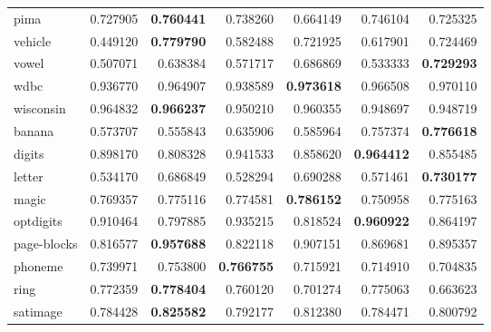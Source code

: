 \begin{tabular}{lrrrrrr}
pima            &         0.727905 &  \textbf{0.760441} &                  0.738260 &       0.664149 &                  0.746104 &       0.725325 \\
vehicle         &         0.449120 &  \textbf{0.779790} &                  0.582488 &       0.721925 &                  0.617901 &       0.724469 \\
vowel           &         0.507071 &  0.638384 &                  0.571717 &       0.686869 &                  0.533333 &       \textbf{0.729293} \\
wdbc            &         0.936770 &  0.964907 &                  0.938589 &       \textbf{0.973618} &                  0.966508 &       0.970110 \\
wisconsin       &         0.964832 &  \textbf{0.966237} &                  0.950210 &       0.960355 &                  0.948697 &       0.948719 \\
banana          &         0.573707 &  0.555843 &                  0.635906 &       0.585964 &                  0.757374 &       \textbf{0.776618} \\
digits          &         0.898170 &  0.808328 &                  0.941533 &       0.858620 &                  \textbf{0.964412} &       0.855485 \\
letter          &         0.534170 &  0.686849 &                  0.528294 &       0.690288 &                  0.571461 &       \textbf{0.730177} \\
magic           &         0.769357 &  0.775116 &                  0.774581 &       \textbf{0.786152} &                  0.750958 &       0.775163 \\
optdigits       &         0.910464 &  0.797885 &                  0.935215 &       0.818524 &                  \textbf{0.960922} &       0.864197 \\
page-blocks     &         0.816577 &  \textbf{0.957688} &                  0.822118 &       0.907151 &                  0.869681 &       0.895357 \\
phoneme         &         0.739971 &  0.753800 &                  \textbf{0.766755} &       0.715921 &                  0.714910 &       0.704835 \\
ring            &         0.772359 &  \textbf{0.778404} &                  0.760120 &       0.701274 &                  0.775063 &       0.663623 \\
satimage        &         0.784428 &  \textbf{0.825582} &                  0.792177 &       0.812380 &                  0.784471 &       0.800792 \\

\end{tabular}
